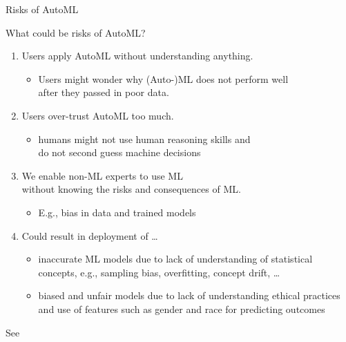 \begin{frame}[c]{Risks of AutoML}

What could be risks of AutoML?

\begin{enumerate}
  \item Users apply AutoML without understanding anything.
  \begin{itemize}
    \item Users might wonder why (Auto-)ML does not perform well\\ after they passed in poor data. 
  \end{itemize}
  \pause
  \item Users over-trust AutoML too much.
  \begin{itemize}
    \item humans might not use human reasoning skills and\\ do not second guess machine decisions
  \end{itemize}
  \pause
  \item We enable non-ML experts to use ML\\ without knowing the risks and consequences of ML.
  \begin{itemize}
  	\item E.g., bias in data and trained models
  \end{itemize}
  \pause
  \item Could result in deployment of \ldots
  \begin{itemize}
    \item inaccurate ML models due to lack of understanding of statistical concepts, e.g., sampling bias, overfitting, concept drift, \ldots
    \item biased and unfair models due to lack of understanding ethical practices and use of features such as gender and race for predicting outcomes
  \end{itemize}
\end{enumerate}

See 

\end{frame}
